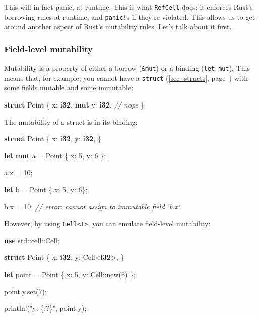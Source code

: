 \documentclass[a4paper,]{book}
\renewcommand*{\hyperref}[2][\ar]{%
  \def\ar{#2}%
  #2 (\autoref{#1}, page~\pageref{#1})}
\newenvironment{Shaded}{\begin{snugshade}}{\end{snugshade}}
\newcommand{\KeywordTok}[1]{\textcolor[rgb]{0.13,0.29,0.53}{\textbf{{#1}}}}
\newcommand{\DecValTok}[1]{\textcolor[rgb]{0.00,0.00,0.81}{{#1}}}
\newcommand{\StringTok}[1]{\textcolor[rgb]{0.31,0.60,0.02}{{#1}}}
\newcommand{\CommentTok}[1]{\textcolor[rgb]{0.56,0.35,0.01}{\textit{{#1}}}}
\newcommand{\OtherTok}[1]{\textcolor[rgb]{0.56,0.35,0.01}{{#1}}}
\newcommand{\NormalTok}[1]{{#1}}
\begin{document}
This will in fact panic, at runtime. This is what \texttt{RefCell} does:
it enforces Rust's borrowing rules at runtime, and \texttt{panic!}s if
they're violated. This allows us to get around another aspect of Rust's
mutability rules. Let's talk about it first.

\subsubsection{Field-level mutability}\label{field-level-mutability}

Mutability is a property of either a borrow (\texttt{\&mut}) or a
binding (\texttt{let\ mut}). This means that, for example, you cannot
have a \hyperref[sec--structs]{\texttt{struct}} with some fields mutable
and some immutable:

\begin{Shaded}
\begin{Highlighting}[]
\KeywordTok{struct} \NormalTok{Point \{}
    \NormalTok{x: }\KeywordTok{i32}\NormalTok{,}
    \KeywordTok{mut} \NormalTok{y: }\KeywordTok{i32}\NormalTok{, }\CommentTok{// nope}
\NormalTok{\}}
\end{Highlighting}
\end{Shaded}

The mutability of a struct is in its binding:

\begin{Shaded}
\begin{Highlighting}[]
\KeywordTok{struct} \NormalTok{Point \{}
    \NormalTok{x: }\KeywordTok{i32}\NormalTok{,}
    \NormalTok{y: }\KeywordTok{i32}\NormalTok{,}
\NormalTok{\}}

\KeywordTok{let} \KeywordTok{mut} \NormalTok{a = Point \{ x: }\DecValTok{5}\NormalTok{, y: }\DecValTok{6} \NormalTok{\};}

\NormalTok{a.x = }\DecValTok{10}\NormalTok{;}

\KeywordTok{let} \NormalTok{b = Point \{ x: }\DecValTok{5}\NormalTok{, y: }\DecValTok{6}\NormalTok{\};}

\NormalTok{b.x = }\DecValTok{10}\NormalTok{; }\CommentTok{// error: cannot assign to immutable field `b.x`}
\end{Highlighting}
\end{Shaded}

However, by using \texttt{Cell\textless{}T\textgreater{}}, you can
emulate field-level mutability:

\begin{Shaded}
\begin{Highlighting}[]
\KeywordTok{use} \NormalTok{std::cell::Cell;}

\KeywordTok{struct} \NormalTok{Point \{}
    \NormalTok{x: }\KeywordTok{i32}\NormalTok{,}
    \NormalTok{y: Cell<}\KeywordTok{i32}\NormalTok{>,}
\NormalTok{\}}

\KeywordTok{let} \NormalTok{point = Point \{ x: }\DecValTok{5}\NormalTok{, y: Cell::new(}\DecValTok{6}\NormalTok{) \};}

\NormalTok{point.y.set(}\DecValTok{7}\NormalTok{);}

\OtherTok{println!}\NormalTok{(}\StringTok{"y: \{:?\}"}\NormalTok{, point.y);}
\end{Highlighting}
\end{Shaded}
\end{document}
